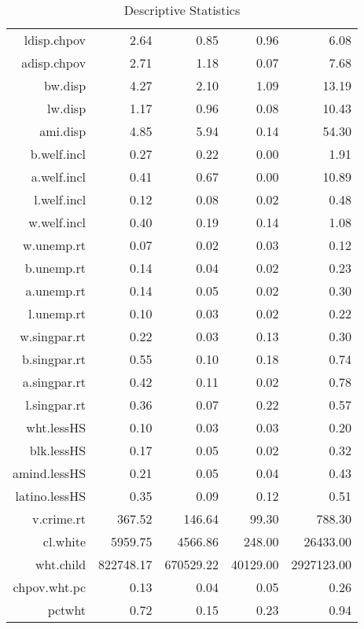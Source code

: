 \begin{table}[ht]
\begin{tabular}{rrrrr}
  ldisp.chpov & 2.64 & 0.85 & 0.96 & 6.08 \\ 
  adisp.chpov & 2.71 & 1.18 & 0.07 & 7.68 \\ 
  bw.disp & 4.27 & 2.10 & 1.09 & 13.19 \\ 
  lw.disp & 1.17 & 0.96 & 0.08 & 10.43 \\ 
  ami.disp & 4.85 & 5.94 & 0.14 & 54.30 \\ 
  b.welf.incl & 0.27 & 0.22 & 0.00 & 1.91 \\ 
  a.welf.incl & 0.41 & 0.67 & 0.00 & 10.89 \\ 
  l.welf.incl & 0.12 & 0.08 & 0.02 & 0.48 \\ 
  w.welf.incl & 0.40 & 0.19 & 0.14 & 1.08 \\ 
  w.unemp.rt & 0.07 & 0.02 & 0.03 & 0.12 \\ 
  b.unemp.rt & 0.14 & 0.04 & 0.02 & 0.23 \\ 
  a.unemp.rt & 0.14 & 0.05 & 0.02 & 0.30 \\ 
  l.unemp.rt & 0.10 & 0.03 & 0.02 & 0.22 \\ 
  w.singpar.rt & 0.22 & 0.03 & 0.13 & 0.30 \\ 
  b.singpar.rt & 0.55 & 0.10 & 0.18 & 0.74 \\ 
  a.singpar.rt & 0.42 & 0.11 & 0.02 & 0.78 \\ 
  l.singpar.rt & 0.36 & 0.07 & 0.22 & 0.57 \\ 
  wht.lessHS & 0.10 & 0.03 & 0.03 & 0.20 \\ 
  blk.lessHS & 0.17 & 0.05 & 0.02 & 0.32 \\ 
  amind.lessHS & 0.21 & 0.05 & 0.04 & 0.43 \\ 
  latino.lessHS & 0.35 & 0.09 & 0.12 & 0.51 \\ 
  v.crime.rt & 367.52 & 146.64 & 99.30 & 788.30 \\ 
  cl.white & 5959.75 & 4566.86 & 248.00 & 26433.00 \\ 
  wht.child & 822748.17 & 670529.22 & 40129.00 & 2927123.00 \\ 
  chpov.wht.pc & 0.13 & 0.04 & 0.05 & 0.26 \\ 
  pctwht & 0.72 & 0.15 & 0.23 & 0.94 \\ 
   \hline
\end{tabular}
\caption{Descriptive Statistics} 
\end{table}
